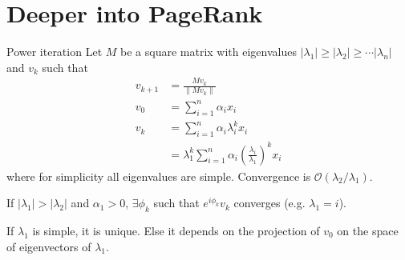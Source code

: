 \documentclass[10pt]{beamer}
\newcommand\bigoh{\mathcal{O}}
\begin{document}
\section{Deeper into PageRank}
\begin{frame}
  \tableofcontents[currentsection]
\end{frame}
\begin{frame}[allowframebreaks]{Power iteration}
  Let $M$ be a square matrix with eigenvalues $|\lambda_1| \geq |\lambda_2| \geq \cdots |\lambda_n|$ and
  $v_k$ such that
  \begin{align*}
    v_{k+1} & = \frac{Mv_k}{\|Mv_k\|}\\
    v_0 & = \sum_{i=1}^n \alpha_i x_i\\
    v_k & = \sum_{i=1}^n \alpha_i \lambda_i^k x_i\\
        & = \lambda_1^k \sum_{i=1}^n \alpha_i \left(\frac{\lambda_i}{\lambda_1}\right)^k x_i
  \end{align*}
  where for simplicity all eigenvalues are simple.
  Convergence is $\bigoh(\lambda_2/\lambda_1)$.

  \framebreak

  If $|\lambda_1| > |\lambda_2|$ and $\alpha_1 > 0$, $\exists \phi_k$ such that $e^{i\phi_k}v_k$ converges (e.g. $\lambda_1 = i$).

  If $\lambda_1$ is simple, it is unique.
  Else it depends on the projection of $v_0$ on the space of eigenvectors of $\lambda_1$.
\end{frame}
\end{document}
